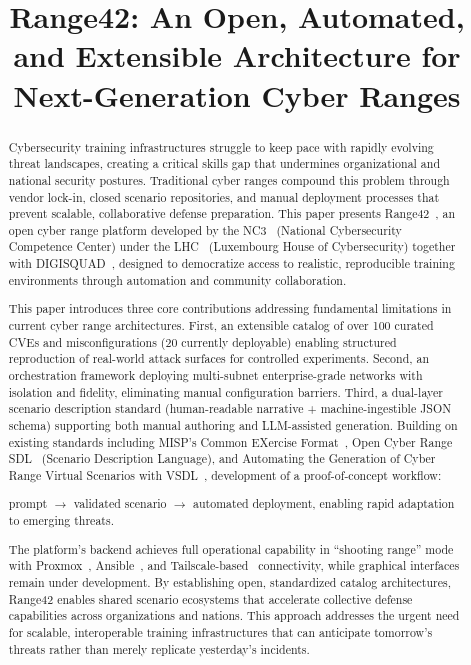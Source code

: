 \documentclass[11pt]{article}
\title{Range42: An Open, Automated, and Extensible Architecture for Next-Generation Cyber Ranges}
\author{} %
\date{}   %
\begin{document}
\maketitle

\begin{abstract}
Cybersecurity training infrastructures struggle to keep pace with rapidly evolving threat landscapes, creating a critical skills gap that undermines organizational and national security postures. Traditional cyber ranges compound this problem through vendor lock-in, closed scenario repositories, and manual deployment processes that prevent scalable, collaborative defense preparation. This paper presents Range42~\cite{range42}, an open cyber range platform developed by the NC3~\cite{NC3} (National Cybersecurity Competence Center) under the LHC~\cite{LHC} (Luxembourg House of Cybersecurity) together with DIGISQUAD~\cite{DIGISQUAD}, designed to democratize access to realistic, reproducible training environments through automation and community collaboration.

This paper introduces three core contributions addressing fundamental limitations in current cyber range architectures. First, an extensible catalog of over 100 curated CVEs and misconfigurations (20 currently deployable) enabling structured reproduction of real-world attack surfaces for controlled experiments. Second, an orchestration framework deploying multi-subnet enterprise-grade networks with isolation and fidelity, eliminating manual configuration barriers. Third, a dual-layer scenario description standard (human-readable narrative + machine-ingestible JSON schema) supporting both manual authoring and LLM-assisted generation. Building on existing standards including MISP's Common EXercise Format~\cite{cexf}, Open Cyber Range SDL~\cite{SDL} (Scenario Description Language), and Automating the Generation of Cyber Range Virtual Scenarios with VSDL~\cite{vsdl2022}, development of a proof-of-concept workflow: 

prompt $\rightarrow$ validated scenario $\rightarrow$ automated deployment, enabling rapid adaptation to emerging threats.


The platform's backend achieves full operational capability in ``shooting range'' mode with Proxmox~\cite{proxmox}, Ansible~\cite{ansible}, and Tailscale-based~\cite{tailscale} connectivity, while graphical interfaces remain under development. By establishing open, standardized catalog architectures, Range42 enables shared scenario ecosystems that accelerate collective defense capabilities across organizations and nations. This approach addresses the urgent need for scalable, interoperable training infrastructures that can anticipate tomorrow's threats rather than merely replicate yesterday's incidents.
\end{abstract}
\end{document}
